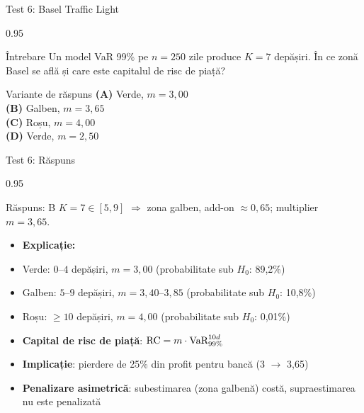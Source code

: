 \documentclass[9pt, aspectratio=169, t]{beamer}
\begin{document}
\begin{frame}[shrink=10]{Test 6: Basel Traffic Light}
\begin{cminipage}{0.95\textwidth}
    \begin{alertblock}{Întrebare}
    Un model VaR 99\% pe $n = 250$ zile produce $K = 7$ depășiri. În ce zonă Basel se află și care este capitalul de risc de piață?
    \end{alertblock}
    \vspace{0.4cm}
    \begin{block}{Variante de răspuns}
    \textcolor{MainBlue}{\textbf{(A)}} Verde, $m = 3{,}00$ \\[3pt]
    \textcolor{MainBlue}{\textbf{(B)}} Galben, $m = 3{,}65$ \\[3pt]
    \textcolor{MainBlue}{\textbf{(C)}} Roșu, $m = 4{,}00$ \\[3pt]
    \textcolor{MainBlue}{\textbf{(D)}} Verde, $m = 2{,}50$
    \end{block}
\end{cminipage}
\end{frame}

\begin{frame}[shrink=10]{Test 6: Răspuns}
\begin{cminipage}{0.95\textwidth}
    \begin{exampleblock}{Răspuns: B}
    $K = 7 \in [5, 9]$ $\Rightarrow$ zona \textcolor{Amber}{galben}, add-on $\approx 0{,}65$; multiplier $m = 3{,}65$.
    \end{exampleblock}
    \vspace{0.2cm}
    \begin{itemize}\setlength{\itemsep}{0pt}
        \item \textbf{Explicație:}
        \item Verde: $0$--$4$ depășiri, $m = 3{,}00$ (probabilitate sub $H_0$: 89{,}2\%)
        \item Galben: $5$--$9$ depășiri, $m = 3{,}40$--$3{,}85$ (probabilitate sub $H_0$: 10{,}8\%)
        \item Roșu: $\geq 10$ depășiri, $m = 4{,}00$ (probabilitate sub $H_0$: 0{,}01\%)
        \item \textbf{Capital de risc de piață}: $\text{RC} = m \cdot \text{VaR}^{10d}_{99\%}$
        \item \textbf{Implicație}: pierdere de 25\% din profit pentru bancă (3 $\to$ 3{,}65)
        \item \textbf{Penalizare asimetrică}: subestimarea (zona galbenă) costă, supraestimarea nu este penalizată
    \end{itemize}
\end{cminipage}
\end{frame}
\end{document}

